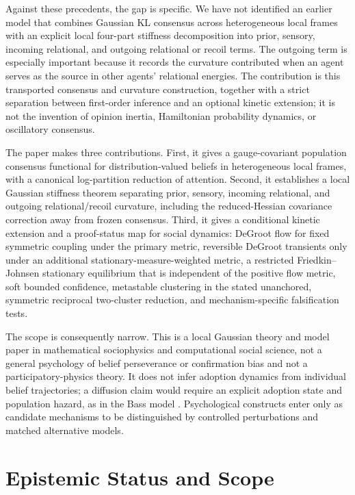 \documentclass[12pt]{article}
\begin{document}
Against these precedents, the gap is specific. We have not identified an earlier model that combines Gaussian KL consensus across heterogeneous local frames with an explicit local four-part stiffness decomposition into prior, sensory, incoming relational, and outgoing relational or recoil terms. The outgoing term is especially important because it records the curvature contributed when an agent serves as the source in other agents' relational energies. The contribution is this transported consensus and curvature construction, together with a strict separation between first-order inference and an optional kinetic extension; it is not the invention of opinion inertia, Hamiltonian probability dynamics, or oscillatory consensus.

The paper makes three contributions. First, it gives a gauge-covariant population consensus functional for distribution-valued beliefs in heterogeneous local frames, with a canonical log-partition reduction of attention. Second, it establishes a local Gaussian stiffness theorem separating prior, sensory, incoming relational, and outgoing relational/recoil curvature, including the reduced-Hessian covariance correction away from frozen consensus. Third, it gives a conditional kinetic extension and a proof-status map for social dynamics: DeGroot flow for fixed symmetric coupling under the primary metric, reversible DeGroot transients only under an additional stationary-measure-weighted metric, a restricted Friedkin--Johnsen stationary equilibrium that is independent of the positive flow metric, soft bounded confidence, metastable clustering in the stated unanchored, symmetric reciprocal two-cluster reduction, and mechanism-specific falsification tests.

The scope is consequently narrow. This is a local Gaussian theory and model paper in mathematical sociophysics and computational social science, not a general psychology of belief perseverance or confirmation bias and not a participatory-physics theory. It does not infer adoption dynamics from individual belief trajectories; a diffusion claim would require an explicit adoption state and population hazard, as in the Bass model \citep{Bass1969}. Psychological constructs enter only as candidate mechanisms to be distinguished by controlled perturbations and matched alternative models.

\section{Epistemic Status and Scope}\label{sec:epistemic_status}
\end{document}
